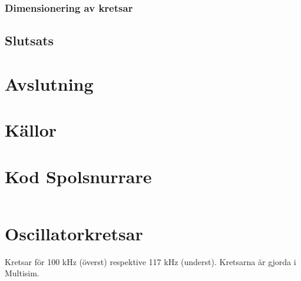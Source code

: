 \documentclass[a4paper]{article}
\begin{document}
\begin{sloppypar}
  \subsubsection{Dimensionering av kretsar}

  \subsection{Slutsats}


  \section{Avslutning}




  \section{Källor}
  \printbibliography[heading=none]

  \appendices
  \titleformat{\section}[display]
  {\normalfont\Large\bfseries}{\appendixname\enspace\thesection}{.5em}{} %
  \section{Kod Spolsnurrare}
  \label{bilaga:Kod_Spolsnurrare}
  \inputminted[breaklines]{cpp}{./Code/Spolsnurrare.cpp}

  \section{Oscillatorkretsar}
  Kretsar för 100 kHz (överst) respektive 117 kHz (underst). Kretsarna är gjorda i Multisim.


\end{sloppypar}
\end{document}
